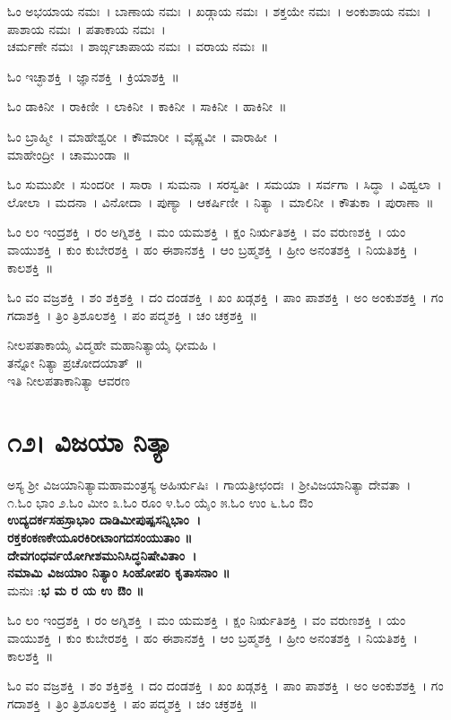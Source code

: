 ಓಂ ಅಭಯಾಯ ನಮಃ~।  ಬಾಣಾಯ ನಮಃ~।  ಖಡ್ಗಾಯ ನಮಃ~।  ಶಕ್ತಯೇ ನಮಃ~।  ಅಂಕುಶಾಯ ನಮಃ~।  ಪಾಶಾಯ ನಮಃ~।  ಪತಾಕಾಯ ನಮಃ~। \\ ಚರ್ಮಣೇ ನಮಃ~।  ಶಾರ್ಙ್ಗಚಾಪಾಯ ನಮಃ~।  ವರಾಯ ನಮಃ~॥

ಓಂ ಇಚ್ಛಾಶಕ್ತಿ~।  ಜ್ಞಾನಶಕ್ತಿ~।  ಕ್ರಿಯಾಶಕ್ತಿ~॥ 

ಓಂ ಡಾಕಿನೀ~।  ರಾಕಿಣೀ~।  ಲಾಕಿನೀ~।  ಕಾಕಿನೀ~।  ಸಾಕಿನೀ~।  ಹಾಕಿನೀ~॥ 

ಓಂ ಬ್ರಾಹ್ಮೀ~।  ಮಾಹೇಶ್ವರೀ~।  ಕೌಮಾರೀ~।  ವೈಷ್ಣವೀ~।  ವಾರಾಹೀ~। \\ ಮಾಹೇಂದ್ರೀ~।  ಚಾಮುಂಡಾ~॥ 

ಓಂ ಸುಮುಖೀ~।  ಸುಂದರೀ~।  ಸಾರಾ~।  ಸುಮನಾ~।  ಸರಸ್ವತೀ~।  ಸಮಯಾ~।  ಸರ್ವಗಾ~।  ಸಿದ್ಧಾ~।  ವಿಹ್ವಲಾ~।  ಲೋಲಾ~।  ಮದನಾ~।  ವಿನೋದಾ~।  ಪುಣ್ಯಾ~।  ಆಕರ್ಷಿಣೀ~।  ನಿತ್ಯಾ~।  ಮಾಲಿನೀ~।  ಕೌತುಕಾ~।  ಪುರಾಣಾ~॥ 

ಓಂ ಲಂ ಇಂದ್ರಶಕ್ತಿ~।  ರಂ ಅಗ್ನಿಶಕ್ತಿ~।  ಮಂ ಯಮಶಕ್ತಿ~।  ಕ್ಷಂ ನಿರ್ಋತಿಶಕ್ತಿ~।  ವಂ ವರುಣಶಕ್ತಿ~।  ಯಂ ವಾಯುಶಕ್ತಿ~।  ಕುಂ ಕುಬೇರಶಕ್ತಿ~।  ಹಂ ಈಶಾನಶಕ್ತಿ~।  ಆಂ ಬ್ರಹ್ಮಶಕ್ತಿ~।  ಹ್ರೀಂ ಅನಂತಶಕ್ತಿ~।  ನಿಯತಿಶಕ್ತಿ~।  ಕಾಲಶಕ್ತಿ~॥ 

ಓಂ ವಂ ವಜ್ರಶಕ್ತಿ~।  ಶಂ ಶಕ್ತಿಶಕ್ತಿ~।  ದಂ ದಂಡಶಕ್ತಿ~।  ಖಂ ಖಡ್ಗಶಕ್ತಿ~।  ಪಾಂ ಪಾಶಶಕ್ತಿ~।  ಅಂ ಅಂಕುಶಶಕ್ತಿ~।  ಗಂ ಗದಾಶಕ್ತಿ~।  ತ್ರಿಂ ತ್ರಿಶೂಲಶಕ್ತಿ~। ಪಂ ಪದ್ಮಶಕ್ತಿ~।  ಚಂ ಚಕ್ರಶಕ್ತಿ~॥

ನೀಲಪತಾಕಾಯೈ ವಿದ್ಮಹೇ ಮಹಾನಿತ್ಯಾಯೈ ಧೀಮಹಿ ।\\ತನ್ನೋ ನಿತ್ಯಾ ಪ್ರಚೋದಯಾತ್~॥\\
ಇತಿ ನೀಲಪತಾಕಾನಿತ್ಯಾ ಆವರಣ
\section{೧೨। ವಿಜಯಾ ನಿತ್ಯಾ}
ಅಸ್ಯ ಶ್ರೀ ವಿಜಯಾನಿತ್ಯಾಮಹಾಮಂತ್ರಸ್ಯ ಅಹಿರ್ಋಷಿಃ~। ಗಾಯತ್ರೀಛಂದಃ~। ಶ್ರೀವಿಜಯಾನಿತ್ಯಾ ದೇವತಾ~।\\
೧.ಓಂ ಭಾಂ ೨.ಓಂ ಮೀಂ ೩.ಓಂ ರೂಂ ೪.ಓಂ ಯೈಂ ೫.ಓಂ ಉಂ ೬.ಓಂ ಔಂ \\
{\bfseries ಉದ್ಯದರ್ಕಸಹಸ್ರಾಭಾಂ ದಾಡಿಮೀಪುಷ್ಪಸನ್ನಿಭಾಂ~।\\
ರಕ್ತಕಂಕಣಕೇಯೂರಕಿರೀಟಾಂಗದಸಂಯುತಾಂ ॥\\
ದೇವಗಂಧರ್ವಯೋಗೀಶಮುನಿಸಿದ್ಧನಿಷೇವಿತಾಂ~।\\
ನಮಾಮಿ ವಿಜಯಾಂ ನಿತ್ಯಾಂ ಸಿಂಹೋಪರಿ ಕೃತಾಸನಾಂ ॥\\}
ಮನುಃ :{\bfseries  ಭ ಮ ರ ಯ ಉ ಔಂ ॥}

ಓಂ ಲಂ ಇಂದ್ರಶಕ್ತಿ~।  ರಂ ಅಗ್ನಿಶಕ್ತಿ~।  ಮಂ ಯಮಶಕ್ತಿ~।  ಕ್ಷಂ ನಿರ್ಋತಿಶಕ್ತಿ~।  ವಂ ವರುಣಶಕ್ತಿ~।  ಯಂ ವಾಯುಶಕ್ತಿ~।  ಕುಂ ಕುಬೇರಶಕ್ತಿ~।  ಹಂ ಈಶಾನಶಕ್ತಿ~।  ಆಂ ಬ್ರಹ್ಮಶಕ್ತಿ~।  ಹ್ರೀಂ ಅನಂತಶಕ್ತಿ~।  ನಿಯತಿಶಕ್ತಿ~।  ಕಾಲಶಕ್ತಿ~॥ 

ಓಂ ವಂ ವಜ್ರಶಕ್ತಿ~।  ಶಂ ಶಕ್ತಿಶಕ್ತಿ~।  ದಂ ದಂಡಶಕ್ತಿ~।  ಖಂ ಖಡ್ಗಶಕ್ತಿ~।  ಪಾಂ ಪಾಶಶಕ್ತಿ~।  ಅಂ ಅಂಕುಶಶಕ್ತಿ~।  ಗಂ ಗದಾಶಕ್ತಿ~।  ತ್ರಿಂ ತ್ರಿಶೂಲಶಕ್ತಿ~।  ಪಂ ಪದ್ಮಶಕ್ತಿ~।  ಚಂ ಚಕ್ರಶಕ್ತಿ~॥ 

